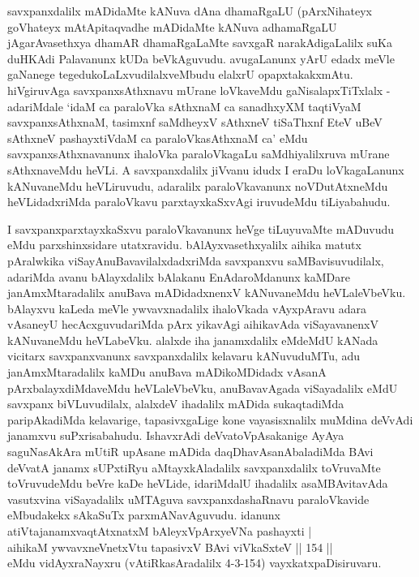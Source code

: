 \begin{artha}%
savxpanxdalilx mADidaMte kANuva dAna dhamaRgaLU (pArxNihateyx goVhateyx mAtApitaqvadhe mADidaMte kANuva adhamaRgaLU jAgarAvasethxya dhamAR dhamaRgaLaMte savxgaR narakAdigaLalilx suKa duHKAdi Palavanunx kUDa beVkAguvudu. avugaLanunx yArU edadx meVle gaNanege tegedukoLaLxvudilalxveMbudu elalxrU opapxtakakxmAtu. hiVgiruvAga savxpanxsAthxnavu mUrane loVkaveMdu gaNisalapxTiTxlalx - adariMdale `idaM ca paraloVka sAthxnaM ca sanadhxyXM taqtiVyaM savxpanxsAthxnaM, tasimxnf saMdheyxV sAthxneV tiSaThxnf EteV uBeV sAthxneV pashayxtiVdaM ca paraloVkasAthxnaM ca' eMdu savxpanxsAthxnavanunx ihaloVka paraloVkagaLu saMdhiyalilxruva mUrane sAthxnaveMdu heVLi. A savxpanxdalilx jiVvanu idudx I eraDu loVkagaLanunx kANuvaneMdu heVLiruvudu, adaralilx paraloVkavanunx noVDutAtxneMdu heVLidadxriMda paraloVkavu parxtayxkaSxvAgi iruvudeMdu tiLiyabahudu. 
\end{artha}

\begin{artha}
I savxpanxparxtayxkaSxvu paraloVkavanunx heVge tiLuyuvaMte mADuvudu eMdu parxshinxsidare utatxravidu. bAlAyxvasethxyalilx aihika matutx pAralwkika viSayAnuBavavilalxdadxriMda savxpanxvu saMBavisuvudilalx, adariMda avanu bAlayxdalilx bAlakanu EnAdaroMdanunx kaMDare janAmxMtaradalilx anuBava mADidadxnenxV kANuvaneMdu heVLaleVbeVku. bAlayxvu kaLeda meVle ywvavxnadalilx ihaloVkada vAyxpAravu adara vAsaneyU hecAcxguvudariMda pArx yikavAgi aihikavAda viSayavanenxV kANuvaneMdu heVLabeVku. alalxde iha janamxdalilx eMdeMdU kANada vicitarx savxpanxvanunx savxpanxdalilx kelavaru kANuvuduMTu, adu janAmxMtaradalilx kaMDu anuBava mADikoMDidadx vAsanA pArxbalayxdiMdaveMdu heVLaleVbeVku, anuBavavAgada viSayadalilx eMdU savxpanx biVLuvudilalx, alalxdeV ihadalilx mADida sukaqtadiMda paripAkadiMda kelavarige, tapasivxgaLige kone vayasisxnalilx muMdina deVvAdi janamxvu suPxrisabahudu. IshavxrAdi deVvatoVpAsakanige AyAya saguNasAkAra mUtiR upAsane mADida daqDhavAsanAbaladiMda BAvi deVvatA janamx sUPxtiRyu aMtayxkAladalilx savxpanxdalilx toVruvaMte toVruvudeMdu beVre kaDe heVLide, idariMdalU ihadalilx asaMBAvitavAda vasutxvina viSayadalilx uMTAguva savxpanxdashaRnavu paraloVkavide eMbudakekx sAkaSuTx parxmANavAguvudu. idanunx\\ atiVtajanamxvaqtAtxnatxM bAleyxVpArxyeVNa pashayxti |\\
aihikaM ywvavxneV\s netxVtu tapasivxV BAvi viVkaSxteV || 154 ||\\ eMdu vidAyxraNayxru (vAtiRkasAradalilx 4-3-154) vayxkatxpaDisiruvaru.
\end{artha}%

